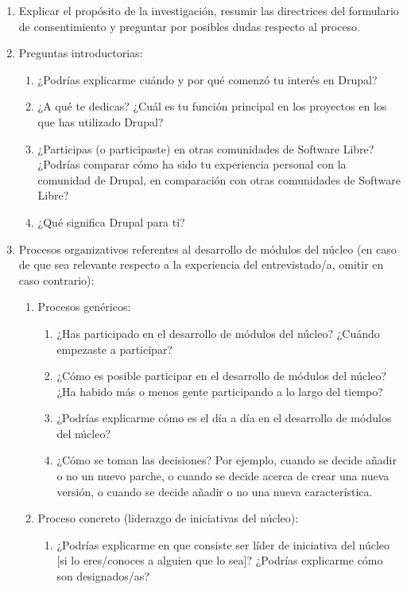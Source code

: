 \begin{enumerate}
	\item Explicar el propósito de la investigación, resumir las directrices del formulario de consentimiento y preguntar por posibles dudas respecto al proceso.
	\item Preguntas introductorias:
		\begin{enumerate}
			\item ¿Podrías explicarme cuándo y por qué comenzó tu interés en Drupal?
			\item ¿A qué te dedicas? ¿Cuál es tu función principal en los proyectos en los que has utilizado Drupal?
			\item ¿Participas (o participaste) en otras comunidades de Software Libre? ¿Podrías comparar cómo ha sido tu experiencia personal con la comunidad de Drupal, en comparación con otras comunidades de Software Libre?
			\item ¿Qué significa Drupal para ti?
		\end{enumerate}
	
	\item Procesos organizativos referentes al desarrollo de módulos del núcleo (en caso de que sea relevante respecto a la experiencia del entrevistado/a, omitir en caso contrario):
		\begin{enumerate}
			\item Procesos genéricos:
			\begin{enumerate}
				\item ¿Has participado en el desarrollo de módulos del núcleo? ¿Cuándo empezaste a participar?
				\item ¿Cómo es posible participar en el desarrollo de módulos del núcleo? ¿Ha habido más o menos gente participando a lo largo del tiempo?
				\item ¿Podrías explicarme cómo es el día a día en el desarrollo de módulos del núcleo?
				\item ¿Cómo se toman las decisiones? Por ejemplo, cuando se decide añadir o no un nuevo parche, o cuando se decide acerca de crear una nueva versión, o cuando se decide añadir o no una nueva característica.
			\end{enumerate}	
			\item Proceso concreto (liderazgo de iniciativas del núcleo):
			\begin{enumerate}		
				\item ¿Podrías explicarme en que consiste ser líder de iniciativa del núcleo [si lo eres/conoces a alguien que lo sea]? ¿Podrías explicarme cómo son designados/as?


\end{enumerate}
\end{enumerate}
\end{enumerate}

